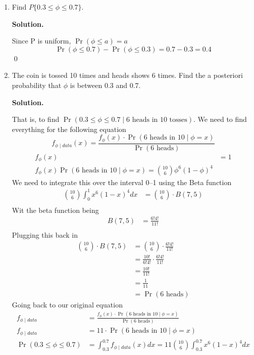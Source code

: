 \documentclass[11pt]{article}
\newenvironment{solution}{\par\noindent\textbf{Solution.}\ }{\par\vspace{6pt}}
\begin{document}
    \begin{enumerate}[label=(\alph*)]

    \item Find $P\{0.3 \le \phi \le 0.7\}$.

    \begin{solution}

        Since P is uniform, $\Pr(\phi \le a) = a$
        \[
            \Pr(\phi \le 0.7) - \Pr(\phi \le 0.3) = 0.7 - 0.3 = 0.4
        \]
        \qed

    \end{solution}

    \item The coin is tossed 10 times and heads shows 6 times. Find the a posteriori probability that $\phi$ is between 0.3 and 0.7.

    \begin{solution}

        That is, to find $\Pr(0.3 \le \phi \le 0.7 \mid \text{6 heads in 10 tosses})$.
        We need to find everything for the following equation
        \[
            f_{\phi \mid data}(x) = \frac{f_{\phi}(x) \cdot \Pr(\text{6 heads in 10} \mid \phi = x)}{\Pr(\text{6 heads})}
        \]
        \begin{align}
            f_{\phi}(x) &= 1 \\
            f_{\phi}(x)\Pr(\text{6 heads in 10} \mid \phi = x) = \binom{10}{6}\phi^6(1-\phi)^4
        \end{align}
        We need to integrate this over the interval 0--1 using the Beta function
        \begin{align}
            \binom{10}{6} \int_{0}^{1} x^6(1-x)^4 dx &= \binom{10}{6} \cdot B(7, 5) \\
        \end{align}
        Wit the beta function being
        \begin{align}
            B(7, 5) &= \frac{6!4!}{11!} \\
        \end{align}
        Plugging this back in
        \begin{align}
            \binom{10}{6} \cdot B(7, 5) &= \binom{10}{6} \cdot \frac{6!4!}{11!} \\
            &= \frac{10!}{6!4!} \cdot \frac{6!4!}{11!} \\
            &= \frac{10!}{11!} \\
            &= \frac{1}{11} \\
            &= \Pr(\text{6 heads})
        \end{align}
        Going back to our original equation
        \begin{align}
            f_{\phi \mid data} &= \frac{f_{\phi}(x) \cdot \Pr(\text{6 heads in 10} \mid \phi = x)}{\Pr(\text{6 heads})} \\
            f_{\phi \mid data} &= 11 \cdot \Pr(\text{6 heads in 10} \mid \phi = x) \\
            \Pr(0.3 \leq \phi \leq 0.7) &= \int_{0.3}^{0.7} f_{\phi \mid data}(x)dx = 11 \binom{10}{6} \int_{0.3}^{0.7} x^6(1-x)^{4}dx \\
        \end{align}


\end{solution}
\end{enumerate}
\end{document}
